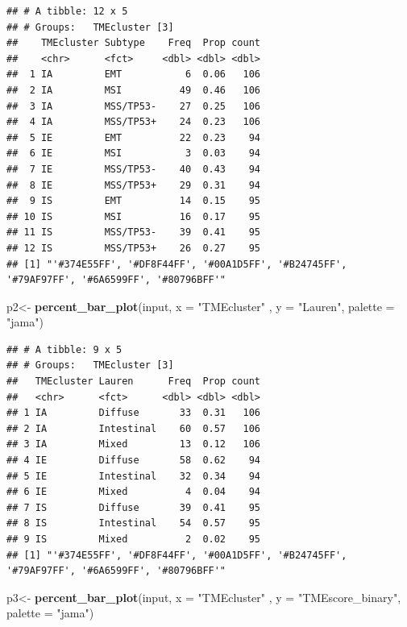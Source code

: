 \documentclass[
  12pt,
]{book}
\newenvironment{Shaded}{\begin{snugshade}}{\end{snugshade}}
\newcommand{\AttributeTok}[1]{\textcolor[rgb]{0.13,0.29,0.53}{#1}}
\newcommand{\FunctionTok}[1]{\textcolor[rgb]{0.13,0.29,0.53}{\textbf{#1}}}
\newcommand{\NormalTok}[1]{#1}
\newcommand{\OtherTok}[1]{\textcolor[rgb]{0.56,0.35,0.01}{#1}}
\newcommand{\StringTok}[1]{\textcolor[rgb]{0.31,0.60,0.02}{#1}}
\theoremstyle{definition}
\theoremstyle{definition}
\theoremstyle{definition}
\theoremstyle{definition}
\theoremstyle{remark}
\begin{document}
\begin{verbatim}
## # A tibble: 12 x 5
## # Groups:   TMEcluster [3]
##    TMEcluster Subtype    Freq  Prop count
##    <chr>      <fct>     <dbl> <dbl> <dbl>
##  1 IA         EMT           6  0.06   106
##  2 IA         MSI          49  0.46   106
##  3 IA         MSS/TP53-    27  0.25   106
##  4 IA         MSS/TP53+    24  0.23   106
##  5 IE         EMT          22  0.23    94
##  6 IE         MSI           3  0.03    94
##  7 IE         MSS/TP53-    40  0.43    94
##  8 IE         MSS/TP53+    29  0.31    94
##  9 IS         EMT          14  0.15    95
## 10 IS         MSI          16  0.17    95
## 11 IS         MSS/TP53-    39  0.41    95
## 12 IS         MSS/TP53+    26  0.27    95
## [1] "'#374E55FF', '#DF8F44FF', '#00A1D5FF', '#B24745FF', '#79AF97FF', '#6A6599FF', '#80796BFF'"
\end{verbatim}

\begin{Shaded}
\begin{Highlighting}[]
\NormalTok{p2}\OtherTok{\textless{}{-}} \FunctionTok{percent\_bar\_plot}\NormalTok{(input, }\AttributeTok{x =} \StringTok{"TMEcluster"}\NormalTok{ , }\AttributeTok{y =} \StringTok{"Lauren"}\NormalTok{, }\AttributeTok{palette =} \StringTok{"jama"}\NormalTok{)}
\end{Highlighting}
\end{Shaded}

\begin{verbatim}
## # A tibble: 9 x 5
## # Groups:   TMEcluster [3]
##   TMEcluster Lauren      Freq  Prop count
##   <chr>      <fct>      <dbl> <dbl> <dbl>
## 1 IA         Diffuse       33  0.31   106
## 2 IA         Intestinal    60  0.57   106
## 3 IA         Mixed         13  0.12   106
## 4 IE         Diffuse       58  0.62    94
## 5 IE         Intestinal    32  0.34    94
## 6 IE         Mixed          4  0.04    94
## 7 IS         Diffuse       39  0.41    95
## 8 IS         Intestinal    54  0.57    95
## 9 IS         Mixed          2  0.02    95
## [1] "'#374E55FF', '#DF8F44FF', '#00A1D5FF', '#B24745FF', '#79AF97FF', '#6A6599FF', '#80796BFF'"
\end{verbatim}

\begin{Shaded}
\begin{Highlighting}[]
\NormalTok{p3}\OtherTok{\textless{}{-}} \FunctionTok{percent\_bar\_plot}\NormalTok{(input, }\AttributeTok{x =} \StringTok{"TMEcluster"}\NormalTok{ , }\AttributeTok{y =} \StringTok{"TMEscore\_binary"}\NormalTok{, }\AttributeTok{palette =} \StringTok{"jama"}\NormalTok{)}
\end{Highlighting}
\end{Shaded}
\end{document}
